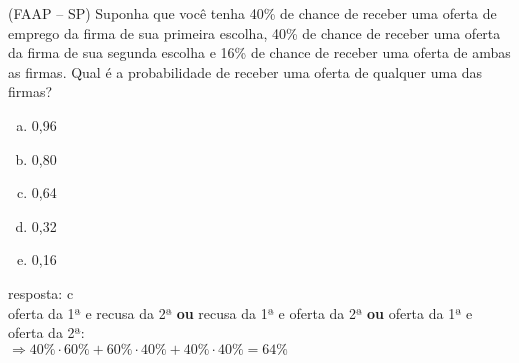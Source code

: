 \begin{ex}
(FAAP – SP) Suponha que você tenha 40\% de chance de receber uma oferta de emprego da firma de sua primeira escolha, 40\% de chance de receber uma oferta da firma de sua segunda escolha e 16\% de chance de receber uma oferta de ambas as firmas. Qual é a probabilidade de receber uma oferta de qualquer uma das firmas?
   \begin{enumerate}[(a)]
   \item 0,96
   \item 0,80
   \item 0,64
   \item 0,32
   \item 0,16
   \end{enumerate}

 \begin{sol}
   resposta: c \\
   oferta da 1ª e recusa da 2ª \textbf{ou} recusa da 1ª e oferta da 2ª \textbf{ou} oferta da 1ª e oferta da 2ª:\\
   $\Longrightarrow 40\%\cdot60\%+60\%\cdot40\%+40\%\cdot40\%=64\%$
 \end{sol}
\end{ex}